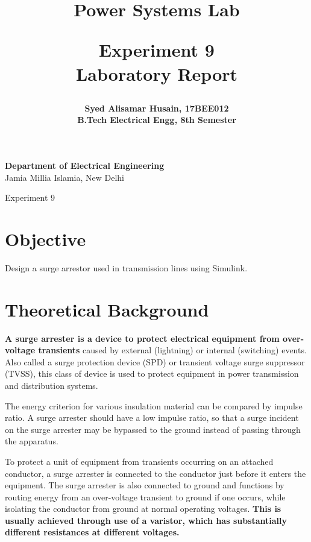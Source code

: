 \documentclass[a4paper,12pt]{article}
\title{
  {\Huge \bf Power Systems Lab}\\
  \vspace{0.25in}

  {\bf Experiment 9}\\
  Laboratory Report
  \vspace{1in}
}
\author{
  \bf Syed Alisamar Husain, 17BEE012\\
  B.Tech Electrical Engg, 8th Semester
}
\begin{document}
  \begin{titlepage}
    \maketitle
    \vspace*{\fill}
    \begin{center}
      {\bfseries Department of Electrical Engineering} \\
      Jamia Millia Islamia, New Delhi
    \end{center}
    \thispagestyle{empty}
  \end{titlepage}
  
  \newpage
  \begin{center}
    \huge Experiment 9
    \vspace{0.5in}
  \end{center}

  \section{Objective}
  Design a surge arrestor used in transmission lines
  using Simulink.

  \section{Theoretical Background}
  {\bf A surge arrester is a device to protect electrical equipment from over-voltage 
  transients} caused by external (lightning) or internal (switching) events. 
  Also called a surge protection device (SPD) or transient voltage surge 
  suppressor (TVSS), this class of device is used to protect equipment in 
  power transmission and distribution systems.
  
  The energy criterion for various insulation material can be compared by 
  impulse ratio. A surge arrester should have a low impulse ratio, so that 
  a surge incident on the surge arrester may be bypassed to the ground 
  instead of passing through the apparatus.

  To protect a unit of equipment from transients occurring on an attached 
  conductor, a surge arrester is connected to the conductor just before it 
  enters the equipment. The surge arrester is also connected to ground and 
  functions by routing energy from an over-voltage transient to ground if 
  one occurs, while isolating the conductor from ground at normal operating 
  voltages. {\bf This is usually achieved through use of a varistor, 
  which has substantially different resistances at different voltages.}
  
\end{document}

